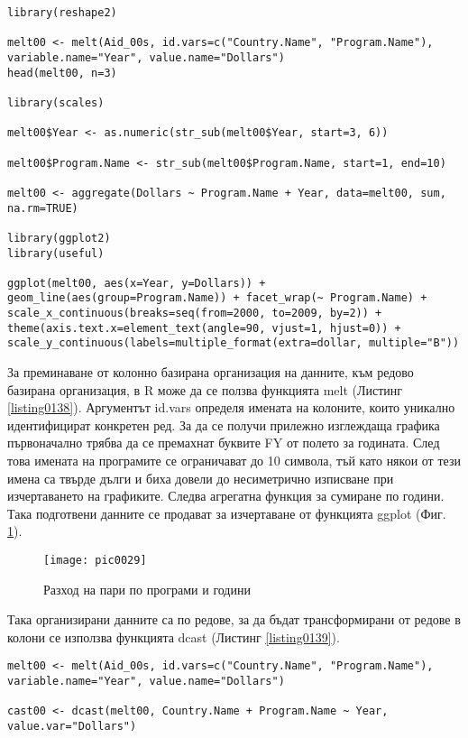 \begin{lstlisting}[caption=От колони към редове, label=listing0138]
library(reshape2)

melt00 <- melt(Aid_00s, id.vars=c("Country.Name", "Program.Name"), variable.name="Year", value.name="Dollars")
head(melt00, n=3)

library(scales)

melt00$Year <- as.numeric(str_sub(melt00$Year, start=3, 6))

melt00$Program.Name <- str_sub(melt00$Program.Name, start=1, end=10)

melt00 <- aggregate(Dollars ~ Program.Name + Year, data=melt00, sum, na.rm=TRUE)

library(ggplot2)
library(useful)

ggplot(melt00, aes(x=Year, y=Dollars)) + geom_line(aes(group=Program.Name)) + facet_wrap(~ Program.Name) + scale_x_continuous(breaks=seq(from=2000, to=2009, by=2)) + theme(axis.text.x=element_text(angle=90, vjust=1, hjust=0)) + scale_y_continuous(labels=multiple_format(extra=dollar, multiple="B"))
\end{lstlisting}

За преминаване от колонно базирана организация на данните, към редово базирана организация, в R може да се ползва функцията melt (Листинг \ref{listing0138}). Аргументът id.vars определя имената на колоните, които уникално идентифицират конкретен ред. За да се получи прилежно изглеждаща графика първоначално трябва да се премахнат буквите FY от полето за годината. След това имената на програмите се ограничават до 10 символа, тъй като някои от тези имена са твърде дълги и биха довели до несиметрично изписване при изчертаването на графиките. Следва агрегатна функция за сумиране по години. Така подготвени данните се продават за изчертаване от функцията ggplot (Фиг. \ref{figure0029}).

\begin{figure}[h!]
  \centering
  \texttt{[image: pic0029]}
  \caption{Разход на пари по програми и години}
\label{figure0029}
\end{figure}
\FloatBarrier

Така организирани данните са по редове, за да бъдат трансформирани от редове в колони се използва функцията dcast (Листинг \ref{listing0139}). 

\begin{lstlisting}[caption=От редове към колони, label=listing0139]
melt00 <- melt(Aid_00s, id.vars=c("Country.Name", "Program.Name"), variable.name="Year", value.name="Dollars")
 
cast00 <- dcast(melt00, Country.Name + Program.Name ~ Year, value.var="Dollars")
\end{lstlisting}


